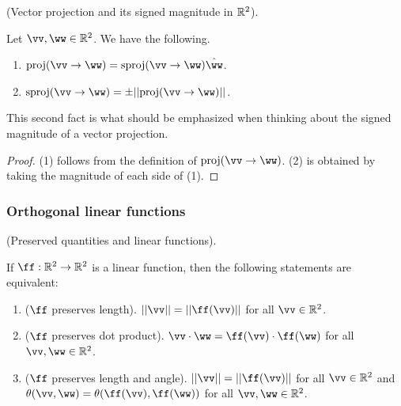 \begin{theorem}
\label{ch::lin_alg::thm::vector_proj_Signed_magnitude}
    (Vector projection and its signed magnitude in $\mathbb{R}^2$).

    Let $\vv, \ww \in \R^2$. We have the following.
    
    \begin{enumerate}
        \item $\proj(\vv \rightarrow \ww) = \sproj(\vv \rightarrow \ww) \hww$.
        \item $\sproj(\vv \rightarrow \ww) = \pm ||\proj(\vv \rightarrow \ww)||$.
    \end{enumerate}

    This second fact is what should be emphasized when thinking about the signed magnitude of a vector projection.
\end{theorem}

\begin{proof}
    (1) follows from the definition of $\proj(\vv \rightarrow \ww)$. (2) is obtained by taking the magnitude of each side of (1).
\end{proof}

\subsubsection*{Orthogonal linear functions}

\begin{theorem}
\label{ch::lin_alg::lemma::orthogonal_linear_fns_preserve_alg_dot_product}
    (Preserved quantities and linear functions).
    
    If $\ff:\R^2 \rightarrow \R^2$ is a linear function, then the following statements are equivalent:

    \begin{enumerate}
        \item ($\ff$ preserves length). $||\vv|| = ||\ff(\vv)||$ for all $\vv \in \R^2$.
        \item ($\ff$ preserves dot product). $\vv \cdot \ww = \ff(\vv) \cdot \ff(\ww)$ for all $\vv, \ww \in \R^2$.
        \item ($\ff$ preserves length and angle). $||\vv|| = ||\ff(\vv)||$ for all $\vv \in \R^2$ and $\theta(\vv, \ww) = \theta(\ff(\vv), \ff(\ww))$ for all $\vv, \ww \in \R^2$.
    \end{enumerate}
\end{theorem}

